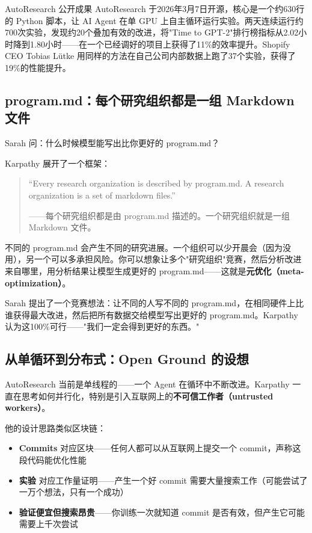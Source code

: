 \begin{knowledgebox}{AutoResearch 公开成果}
AutoResearch 于2026年3月7日开源，核心是一个约630行的 Python 脚本，让 AI Agent 在单 GPU 上自主循环运行实验。两天连续运行约700次实验，发现约20个叠加有效的改进，将"Time to GPT-2"排行榜指标从2.02小时降到1.80小时——在一个已经调好的项目上获得了11\%的效率提升。Shopify CEO Tobias L\"{u}tke 用同样的方法在自己公司内部数据上跑了37个实验，获得了19\%的性能提升。
\end{knowledgebox}

\subsection{program.md：每个研究组织都是一组 Markdown 文件}

Sarah 问：什么时候模型能写出比你更好的 program.md？

Karpathy 展开了一个框架：

\begin{quote}
``Every research organization is described by program.md. A research organization is a set of markdown files.''

——每个研究组织都是由 program.md 描述的。一个研究组织就是一组 Markdown 文件。
\end{quote}

不同的 program.md 会产生不同的研究进展。一个组织可以少开晨会（因为没用），另一个可以多承担风险。你可以想象让多个"研究组织"竞赛，然后分析改进来自哪里，用分析结果让模型生成更好的 program.md——这就是\textbf{元优化（meta-optimization）}。

Sarah 提出了一个竞赛想法：让不同的人写不同的 program.md，在相同硬件上比谁获得最大改进，然后把所有数据交给模型写出更好的 program.md。Karpathy 认为这100\%可行——"我们一定会得到更好的东西。"

\subsection{从单循环到分布式：Open Ground 的设想}

AutoResearch 当前是单线程的——一个 Agent 在循环中不断改进。Karpathy 一直在思考如何并行化，特别是引入互联网上的\textbf{不可信工作者（untrusted workers）}。

他的设计思路类似区块链：
\begin{itemize}
    \item \textbf{Commits} 对应区块——任何人都可以从互联网上提交一个 commit，声称这段代码能优化性能
    \item \textbf{实验} 对应工作量证明——产生一个好 commit 需要大量搜索工作（可能尝试了一万个想法，只有一个成功）
    \item \textbf{验证便宜但搜索昂贵}——你训练一次就知道 commit 是否有效，但产生它可能需要上千次尝试
\end{itemize}

